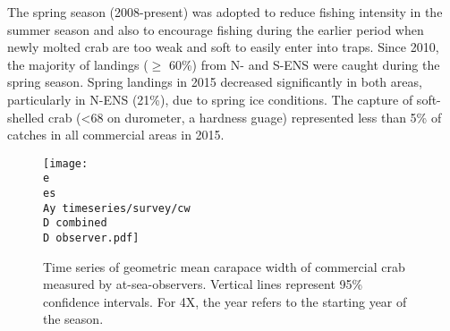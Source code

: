 \documentclass[paper=a4, fontsize=11pt]{article}
\newcommand{\D}{.}
\newcommand{\e}{\string~/ecomod_data/}   %
\newcommand{\es}{snowcrab/}
\newcommand{\Ay}{assessments/2015/}
\begin{document}
The spring season (2008-present) was adopted to reduce fishing intensity in the summer season and also to encourage fishing during the earlier period when newly molted crab are too weak and soft to easily enter into traps. Since 2010, the majority of landings ($\geq$ 60\%) from N- and S-ENS were caught during the spring season. Spring landings in 2015 decreased significantly in both areas, particularly in N-ENS (21\%), due to spring ice conditions. The capture of soft-shelled crab (<68 on durometer, a hardness guage) represented less than 5\% of catches in all commercial areas in 2015.\\

\begin{figure}[h]
    \centering
    \texttt{[image: \\e \\es \\Ay timeseries/survey/cw\\D combined\\D observer.pdf]}
    \caption{Time series of geometric mean carapace width of commercial crab measured by at-sea-observers. Vertical lines represent 95\% confidence intervals. For 4X, the year refers to the starting year of the season.}
\end{figure}
\end{document}
